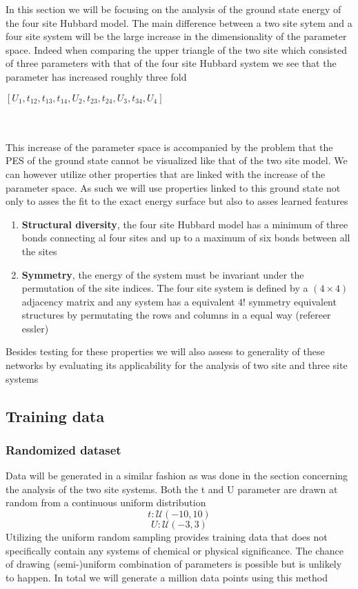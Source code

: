 \documentclass[12pt]{article}
\begin{document}
In this section we will be focusing on the analysis of the ground state energy of the four site Hubbard model. The main difference between a two site sytem and a four site system will be the large increase in the dimensionality of the parameter space. Indeed when comparing the upper triangle of the two site which consisted of three parameters with that of the four site Hubbard system we see that the parameter has increased roughly three fold
\begin{center}
	$\left[ U_1 , t_{12}, t_{13}, t_{14}, U_2, t_{23}, t_{24}, U_3, t_{34},U_4 \right]$
\end{center}
\\
\\
This increase of the parameter space is accompanied by the problem that the PES of the ground state cannot be visualized like that of the two site model. We can however utilize other properties that are linked with the increase of the parameter space. As such we will use properties linked to this ground state not only to asses the fit to the exact energy surface but also to asses learned features
\begin{enumerate}
	\item \textbf{Structural diversity}, the four site Hubbard model has a minimum of three bonds connecting al four sites and up to a maximum of six bonds between all the sites
	\item \textbf{Symmetry}, the energy of the system must be invariant under the permutation of the site indices. The four site system is defined by a $\left(4\times4\right)$ adjacency matrix and any system has a equivalent $4!$ symmetry equivalent structures by permutating the rows and columns in a equal way (refereer essler)
\end{enumerate}
Besides testing for these properties we will also assess to generality of these networks by evaluating its applicability for the analysis of two site and three site systems   

\subsection{Training data}

\subsubsection{Randomized dataset}
Data will be generated in a similar fashion as was done in the section concerning the analysis of the two site systems. Both the t and U parameter are drawn at random from a continuous uniform distribution
\begin{equation*}
t : \mathcal{U}(-10,10)
\end{equation*}
\begin{equation*}
U: \mathcal{U}(-3, 3)
\end{equation*}
Utilizing the uniform random sampling provides training data that does not specifically contain any systems of chemical or physical significance. The chance of drawing (semi-)uniform combination of parameters is possible but is unlikely to happen. In total we will generate a million data points using this method  
\end{document}
